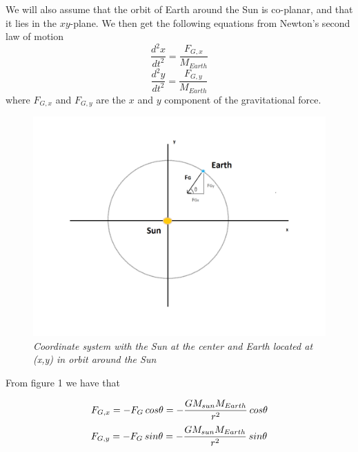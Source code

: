 \documentclass[a4paper,12pt, english]{article}
\begin{document}
We will also assume that the orbit of Earth around the Sun is co-planar, and that it lies in the $xy$-plane. We  then get the following equations from Newton's second law of motion
$$\frac{d^2x}{dt^2} = \frac{F_{G,x}}{M_{Earth}}$$
$$\frac{d^2y}{dt^2} = \frac{F_{G,y}}{M_{Earth}}$$
where $F_{G,x}$ and $F_{G,y}$ are the $x$ and $y$ component of the gravitational force. 


\begin{figure}[h!]
  \centering
    	  \includegraphics[scale=0.4]{project3.png}
  \caption{\textit{Coordinate system with the Sun at the center and Earth located at (x,y) in orbit around the Sun}}
\end{figure}


From figure 1 we have that

$$F_{G,x} = - F_G  \hspace{0.7 mm} cos \theta = - \frac{GM_{sun}M_{Earth}}{r^2} \hspace{0.7 mm} cos \theta $$
$$F_{G,y} = - F_G \hspace{0.7 mm} sin \theta = - \frac{GM_{sun}M_{Earth}}{r^2} \hspace{0.7 mm} sin \theta $$
\end{document}
